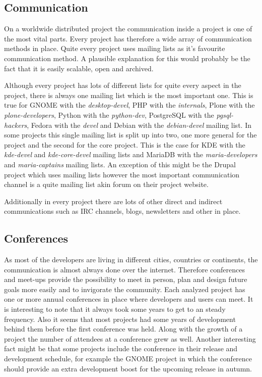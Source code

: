 
\subsection{Communication} %
\label{sub:Communication}

On a worldwide distributed project the communication inside a project is one of
the most vital parts. Every project has therefore a wide array of communication
methods in place. Quite every project uses mailing lists as it's favourite
communication method. A plausible explanation for this would probably be the
fact that it is easily scalable, open and archived.

Although every project has lots of different lists for quite every aspect in
the project, there is always one mailing list which is the most important one.
This is true for GNOME with the \emph{desktop-devel}, PHP with the
\emph{internals}, Plone with the \emph{plone-developers}, Python with the
\emph{python-dev}, PostgreSQL with the \emph{pgsql-hackers}, Fedora with the
\emph{devel} and Debian with the \emph{debian-devel} mailing list. In some
projects this single mailing list is split up into two, one more general for
the project and the second for the core project. This is the case for KDE with
the \emph{kde-devel} and \emph{kde-core-devel} mailing lists and MariaDB with
the \emph{maria-developers} and \emph{maria-captains} mailing lists. An
exception of this might be the Drupal project which uses mailing lists however
the most important communication channel is a quite mailing list akin forum on
their project website.

Additionally in every project there are lots of other direct and indirect
communications such as \ac{IRC} channels, blogs, newsletters and other in
place.


\subsection{Conferences} %
\label{sub:Conferences}

As most of the developers are living in different cities, countries or
continents, the communication is almost always done over the internet.
Therefore conferences and meet-ups provide the possibility to meet in person,
plan and design future goals more easily and to invigorate the community. Each
analyzed project has one or more annual conferences in place where developers
and users can meet. It is interesting to note that it always took some years to
get to an steady frequency. Also it seems that most projects had some years of
development behind them before the first conference was held. Along with the
growth of a project the number of attendees at a conference grew as well.
Another interesting fact might be that some projects include the conference in
their release and development schedule, for example the GNOME project in which
the conference should provide an extra development boost for the upcoming
release in autumn.

